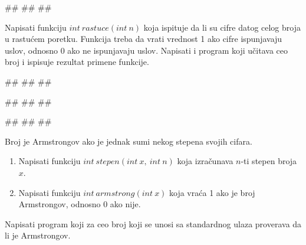 \begin{Exercise}[label=p1.4_]
\begin{Exercise}[label=p1.4_13]
\begin{miditest}
\begin{upotreba}{3}
#\naslovInt#
##
##
\end{upotreba}
\end{miditest}

\end{Exercise}
\begin{Answer}[ref=p1.4_13]
\end{Answer}

\begin{Exercise}[label=p1.4_14] 
  Napisati funkciju $int\ rastuce(int\ n)$ koja ispituje da li su cifre datog celog broja u
rastućem poretku. Funkcija treba da vrati vrednost 1 ako cifre ispunjavaju uslov, odnosno 0 ako ne ispunjavaju uslov. Napisati i program koji učitava ceo broj i ispisuje rezultat primene funkcije. 

\begin{miditest}
\begin{upotreba}{1}
#\naslovInt#
##
##
\end{upotreba}
\end{miditest}
\begin{miditest}
\begin{upotreba}{2}
#\naslovInt#
##
##
\end{upotreba}
\end{miditest}

\begin{miditest}
\begin{upotreba}{3}
#\naslovInt#
##
##
\end{upotreba}
\end{miditest}

\end{Exercise}
\begin{Answer}[ref=p1.4_14]
\end{Answer}

\begin{Exercise}[label=p1.4_15] 
 Broj je Armstrongov ako je jednak sumi nekog stepena svojih cifara.
\begin{enumerate}
\item Napisati funkciju $int\ stepen(int\ x,\ int\ n)$ koja izračunava $n$-ti stepen broja $x$.
\item Napisati funkciju $int\ armstrong(int\ x)$ koja vraća 1 ako je broj Armstrongov, odnosno 0 ako nije.
\end{enumerate}
Napisati program koji za ceo broj koji se unosi sa standardnog ulaza proverava da li je Armstrongov.


\end{Exercise}
\end{Exercise}
